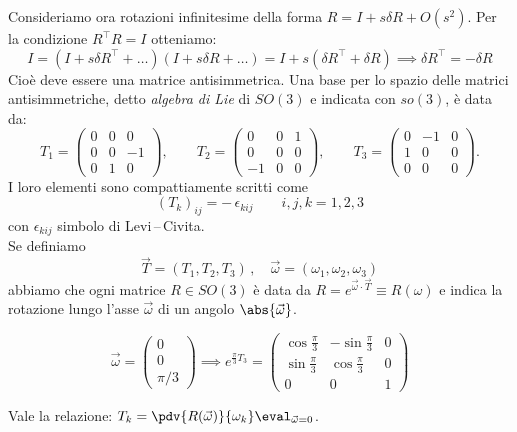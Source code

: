 Consideriamo ora rotazioni infinitesime della forma \(R = I + s \delta R + O(s^2)\). Per la condizione \(R^\intercal R =I\) otteniamo:
\[
    I= (I+s \delta R^\intercal + \dots )(I+s \delta R+ \dots )= I + s(\delta R^\intercal+\delta R )
    \implies \delta R^\intercal=-\delta R 
\]
Cioè deve essere una matrice antisimmetrica. Una base per lo spazio delle matrici antisimmetriche, detto \textit{algebra di Lie} di \(SO(3)\) e indicata con \(so(3)\), è data da:
\[
    T_1=\begin{pmatrix}
        0 & 0 & 0\\
        0 & 0 & -1\\
        0 & 1 & 0
    \end{pmatrix},\qquad
    T_2=\begin{pmatrix}
        0 & 0 & 1\\
        0 & 0 & 0\\
        -1 & 0 & 0
    \end{pmatrix},\qquad
    T_3=\begin{pmatrix}
        0 & -1 & 0\\
        1 & 0 & 0\\
        0 & 0 & 0
    \end{pmatrix} .
\]
I loro elementi sono compattiamente scritti come
\[
    (T_k)_{ij} = -\,\epsilon_{kij} \qquad i,j,k=1,2,3
\]
con $\epsilon_{kij}$ simbolo di Levi\,–\,Civita. \\
Se definiamo 
\[
    \vec T=(T_1,T_2,T_3)\,, \quad \vec\omega=(\omega_1,\omega_2,\omega_3)
\]
abbiamo che 
ogni matrice \(R \in SO(3)\) è data da \(R = e^{\vec{\omega}\cdot \vec{T}}\equiv R(\omega)\) e indica la rotazione lungo l'asse \(\vec{\omega}\) di un angolo \(\abs{\vec{\omega}}\).


\begin{example}
    \[
        \vec{\omega}= \begin{pmatrix}
            0\\0\\\pi/3
        \end{pmatrix}\implies e^{\frac{\pi}{3}T_3} = \begin{pmatrix}
            \cos \frac{\pi}{3}& - \sin \frac{\pi}{3} & 0\\
            \sin \frac{\pi}{3} &\cos \frac{\pi}{3} & 0\\
            0&0&1
        \end{pmatrix}
    \]
\end{example}
\begin{remark}
    Vale la relazione: \(T_k = \pdv{R(\vec{\omega})}{\omega_k}\eval_{\vec{\omega}=0}\).
\end{remark}

